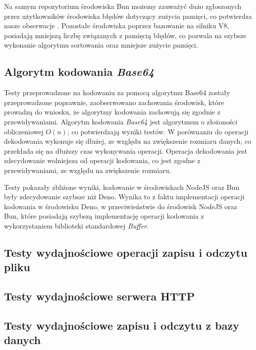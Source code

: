 Na samym repozytorium środowiska Bun możemy zauważyć dużo zgłoszonych przez użytkowników środowiska błędów dotyczący zużycia pamięci, co potwierdza nasze obserwacje \cite{bun_memory}. Pozostałe środowiska poprzez bazowanie na silniku V8, posiadają mniejszą liczbę związanych z pamięcią błędów, co pozwala na szybsze wykonanie algorytmu sortowania oraz mniejsze zużycie pamięci.

\subsection{Algorytm kodowania \textit{Base64}}
Testy przeprowadzone na kodowaniu za pomocą algorytmu Base64 zostały przeprowadzone poprawnie, zaobserwowano zachowania środowisk, które prowadzą do wniosku, że algorytmy kodowania zachowują się zgodnie z przewidywaniami. Algorytm kodowania \textit{Base64} jest algorytmem o złożoności obliczeniowej $O(n)$, co potwierdzają wyniki testów. W porównaniu do operacji dekodowania wykonuje się dłużej, ze względu na zwiększenie rozmiaru danych, co przekłada się na dłuższy czas wykonywania operacji. Operacja dekodowania jest zdecydowanie wolniejsza od operacji kodowania, co jest zgodne z przewidywaniami, ze względu na zwiększenie rozmiaru.

Testy pokazały zbliżone wyniki, kodowanie w środowiskach NodeJS oraz Bun były zdecydowanie szybsze niż Deno. Wynika to z faktu implementacji operacji kodowania w środowisku Deno, w przeciwieństwie do środowisk NodeJS oraz Bun, które posiadają szybszą implementację operacji kodowania z wykorzystaniem biblioteki standardowej \textit{Buffer}. 

\subsection{Testy wydajnościowe operacji zapisu i odczytu pliku}

\subsection{Testy wydajnościowe serwera HTTP}

\subsection{Testy wydajnościowe zapisu i odczytu z bazy danych}
